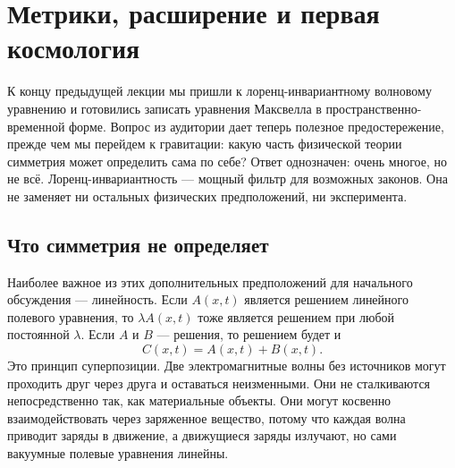 \chapter{Метрики, расширение и первая космология}

К концу предыдущей лекции мы пришли к лоренц-инвариантному волновому уравнению и готовились записать уравнения Максвелла в пространственно-временной форме. Вопрос из аудитории дает теперь полезное предостережение, прежде чем мы перейдем к гравитации: какую часть физической теории симметрия может определить сама по себе? Ответ однозначен: очень многое, но не всё. Лоренц-инвариантность — мощный фильтр для возможных законов. Она не заменяет ни остальных физических предположений, ни эксперимента.

\section{Что симметрия не определяет}

\begin{classroomqa}
\end{classroomqa}

Наиболее важное из этих дополнительных предположений для начального обсуждения — линейность. Если \(A(x,t)\) является решением линейного полевого уравнения, то \(\lambda A(x,t)\) тоже является решением при любой постоянной \(\lambda\). Если \(A\) и \(B\) — решения, то решением будет и
\begin{equation}
  C(x,t)=A(x,t)+B(x,t).
  \label{eq:superposition}
\end{equation}
Это принцип суперпозиции. Две электромагнитные волны без источников могут проходить друг через друга и оставаться неизменными. Они не сталкиваются непосредственно так, как материальные объекты. Они могут косвенно взаимодействовать через заряженное вещество, потому что каждая волна приводит заряды в движение, а движущиеся заряды излучают, но сами вакуумные полевые уравнения линейны.

